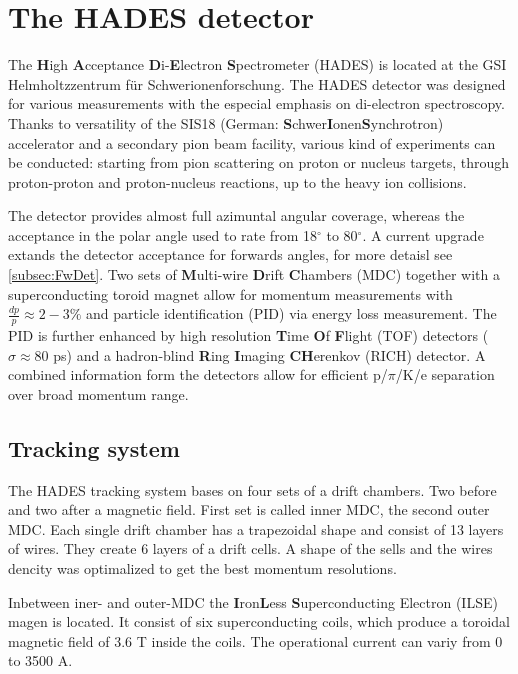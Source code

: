 \chapter{The HADES detector}
\label{chapter:detector}
The \textbf{H}igh \textbf{A}cceptance \textbf{D}i-\textbf{E}lectron \textbf{S}pectrometer (HADES) \cite{Agakishiev:2009am} is located at the GSI Helmholtzzentrum f{\"u}r Schwerionenforschung. The HADES detector was designed for various measurements with the especial emphasis on di-electron spectroscopy. Thanks to versatility of the SIS18 (German: \textbf{S}chwer\textbf{I}onen\textbf{S}ynchrotron) accelerator and a secondary pion beam facility, various kind of experiments can be conducted: starting from pion scattering on proton or nucleus targets, through proton-proton and proton-nucleus reactions, up to the heavy ion collisions.

The detector provides almost full azimuntal angular coverage, whereas the acceptance in the polar angle used to rate from 18$^{\circ}$  to 80$^{\circ}$. A current upgrade extands the detector acceptance for forwards angles, for more detaisl see \ref{subsec:FwDet}. Two sets of \textbf{M}ulti-wire \textbf{D}rift \textbf{C}hambers (MDC) together with a superconducting toroid magnet allow for momentum measurements with $\frac{dp}{p} \approx 2-3\%$ and particle identification (PID) via energy loss measurement. The PID is further enhanced by high resolution \textbf{T}ime \textbf{O}f \textbf{F}light (TOF) detectors ($\sigma \approx 80$ ps) and a hadron-blind \textbf{R}ing \textbf{I}maging \textbf{CH}erenkov (RICH) detector. A combined information form the detectors allow for efficient p/$\pi$/K/e separation over broad momentum range.
\section{Tracking system}
The HADES tracking system bases on four sets of a drift chambers. Two before and two after a magnetic field. First set is called inner MDC, the second outer MDC. Each single drift chamber has a trapezoidal shape and consist of 13 layers of wires. They create 6 layers of a drift cells. A shape of the sells and the wires dencity was optimalized to get the best momentum resolutions.

Inbetween iner- and outer-MDC the \textbf{I}ron\textbf{L}ess \textbf{S}uperconducting Electron (ILSE) magen is located. It consist of six superconducting coils, which produce a toroidal magnetic field of 3.6 T inside the coils. The operational current can variy from 0 to 3500 A. 

